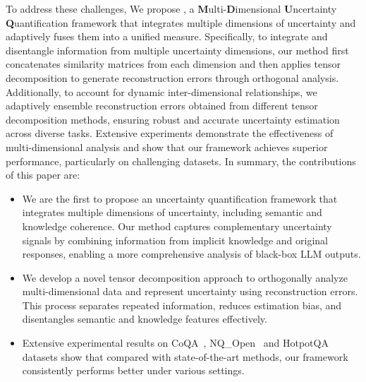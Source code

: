 To address these challenges, We propose \ours, a \textbf{M}ulti-\textbf{D}imensional \textbf{U}ncertainty \textbf{Q}uantification framework that integrates multiple dimensions of uncertainty and adaptively fuses them into a unified measure. Specifically, to integrate and disentangle information from multiple uncertainty dimensions, our method first concatenates similarity matrices from each dimension and then applies tensor decomposition to generate reconstruction errors through orthogonal analysis. Additionally, to account for dynamic inter-dimensional relationships, we adaptively ensemble reconstruction errors obtained from different tensor decomposition methods, ensuring robust and accurate uncertainty estimation across diverse tasks. Extensive experiments demonstrate the effectiveness of multi-dimensional analysis and show that our framework achieves superior performance, particularly on challenging datasets. In summary, the contributions of this paper are:

\begin{itemize}
    \item We are the first to propose an uncertainty quantification framework that integrates multiple dimensions of uncertainty, including semantic and knowledge coherence. Our method captures complementary uncertainty signals by combining information from implicit knowledge and original responses, enabling a more comprehensive analysis of black-box LLM outputs.
    \item We develop a novel tensor decomposition approach to orthogonally analyze multi-dimensional data and represent uncertainty using reconstruction errors. This process separates repeated information, reduces estimation bias, and disentangles semantic and knowledge features effectively.
    \item Extensive experimental results on CoQA~\cite{reddy2019coqa}, NQ\_Open~\cite{kwiatkowski2019natural} and HotpotQA~\cite{yang2018hotpotqa} datasets show that compared with state-of-the-art methods, our framework consistently performs better under various settings.
    
\end{itemize}
